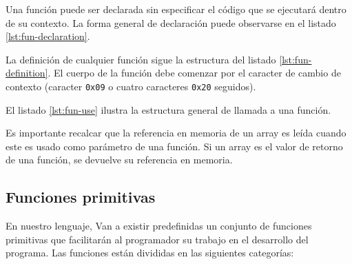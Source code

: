 \documentclass[11pt, english]{article}
\begin{document}
	Una función puede ser declarada sin especificar el código que se ejecutará dentro de su contexto. La forma general de declaración puede observarse en el listado \ref{lst:fun-declaration}.
	
	
	
	La definición de cualquier función sigue la estructura del listado \ref{lst:fun-definition}. El cuerpo de la función debe comenzar por el caracter de cambio de contexto (caracter \texttt{0x09} o cuatro caracteres \texttt{0x20} seguidos).
	
	
	
	El listado \ref{lst:fun-use} ilustra la estructura general de llamada a una función.
	
	
	
	Es importante recalcar que la referencia en memoria de un array es leída cuando este es usado como parámetro de una función. Si un array es el valor de retorno de una función, se devuelve su referencia en memoria.
	
	
	\subsection{Funciones primitivas}
	En nuestro lenguaje, Van a existir predefinidas un conjunto de funciones primitivas que facilitarán al programador su trabajo en el desarrollo del programa. Las funciones están divididas en las siguientes categorías:
	
\end{document}
